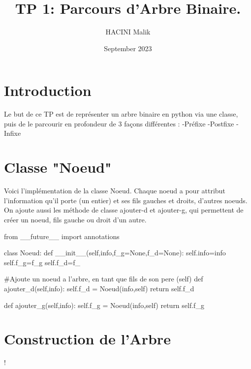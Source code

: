 \documentclass{article}
\title{TP 1: Parcours d'Arbre Binaire.}
\author{HACINI Malik}
\date{September 2023}
\begin{document}
\maketitle
\tableofcontents{}

\section{Introduction}

Le but de ce TP est de représenter un arbre binaire en python via une classe,
puis de le parcourir en profondeur de 3 façons différentes :
\newline
-Préfixe
\newline
-Postfixe
\newline
-Infixe


\section{Classe "Noeud"}
Voici l'implémentation de la classe Noeud.
Chaque noeud a pour attribut l'information qu'il porte (un entier) 
et ses fils gauches et droits, d'autres noeuds.
On ajoute aussi les méthode de classe ajouter-d et ajouter-g, qui
permettent de créer un noeud, fils gauche ou droit d'un autre.

\begin{python}
    from __future__ import annotations

class Noeud:
    def __init__(self,info,f_g=None,f_d=None):
        self.info=info
        self.f_g=f_g
        self.f_d=f_
        
    #Ajoute un noeud a l'arbre, en tant que fils de son pere (self)
    def ajouter_d(self,info):
        self.f_d = Noeud(info,self)
        return self.f_d
    
    def ajouter_g(self,info):
        self.f_g = Noeud(info,self)
        return self.f_g

\end{python}

\section{Construction de l'Arbre}

\begin{center}
\resizebox {\textwidth} {!} {

 }
\end{center}
\end{document}
